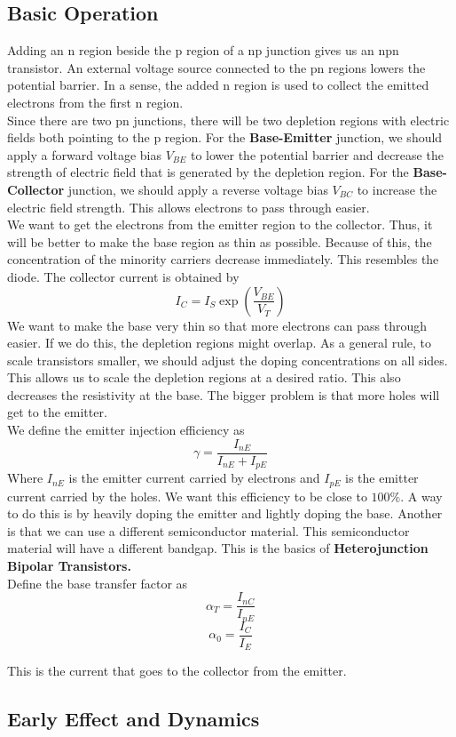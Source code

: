 \documentclass{article}
\begin{document}
\subsection{Basic Operation}
\noindent 
Adding an n region beside the p region of a np junction gives us an npn transistor.
An external voltage source connected to the pn regions lowers the potential barrier.
In a sense, the added n region is used to collect the emitted electrons from the first 
n region. 
\vspace{8pt}
\\ Since there are two pn junctions, there will be two depletion regions with electric
fields both pointing to the p region. For the \textbf{Base-Emitter} junction, we should 
apply a forward voltage bias $V_{BE}$ to lower the potential barrier and decrease the 
strength of electric field that is generated by the depletion region. For the 
\textbf{Base-Collector} junction, we should apply a reverse voltage bias $V_{BC}$ 
to increase the electric field strength. This allows electrons to pass through easier. 
\vspace{8pt}
\\ We want to get the electrons from the emitter region to the collector. Thus, it will
be better to make the base region as thin as possible. Because of this, the 
concentration of the minority carriers decrease immediately. This resembles the diode.
The collector current is obtained by 
$$I_{C}=I_{S}\exp \left(\frac{V_{BE}}{V_{T}}\right)$$
\noindent 
We want to make the base very thin so that more electrons can pass through easier. If
we do this, the depletion regions might overlap. As a general rule, to scale transistors
smaller, we should adjust the doping concentrations on all sides. This allows us to 
scale the depletion regions at a desired ratio. This also decreases the resistivity at
the base. The bigger problem is that more holes will get to the emitter. 
\vspace{8pt}
\\ We define the emitter injection efficiency as 
$$\gamma = \frac{I_{nE}}{I_{nE}+I_{pE}}$$
Where $I_{nE}$ is the emitter current carried by electrons and $I_{pE}$ is the emitter
current carried by the holes. We want this efficiency to be close to $100\%$. A way to 
do this is by heavily doping the emitter and lightly doping the base. Another is that 
we can use a different semiconductor material. This semiconductor material will have 
a different bandgap. This is the basics of \textbf{Heterojunction Bipolar Transistors.}
\vspace{8pt}
\\
Define the base transfer factor as $$\alpha_{T} = \frac{I_{nC}}{I_{nE}}$$
$$\alpha_0 = \frac{I_C}{I_E}$$

\noindent 
This is the current that goes to the collector from the emitter. 

\newpage
\subsection{Early Effect and Dynamics}
\end{document}
